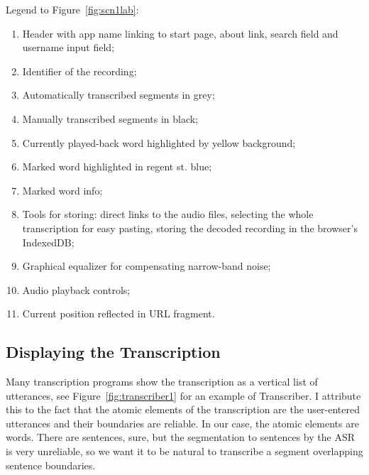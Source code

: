\documentclass[12pt,a4paper]{report}
\begin{document}
Legend to Figure~\ref{fig:scn1lab}:
\begin{enumerate}
\item{
    Header with
    {app name linking to start page,}
    {about link,}
    {search field and}
    {username input field;}
}
\item{Identifier of the recording;}
\item{Automatically transcribed segments in grey;}
\item{Manually transcribed segments in black;}
\item{Currently played-back word highlighted by yellow background;}
\item{Marked word highlighted in regent st. blue;}
\item{Marked word info;}
\item{
    Tools for storing:
    {direct links to the audio files,}
    {selecting the whole transcription for easy pasting,}
    {storing the decoded recording in the browser's IndexedDB;}
}
\item{Graphical equalizer for compensating narrow-band noise;}
\item{Audio playback controls;}
\item{Current position reflected in URL fragment.}
\end{enumerate}

\subsection{Displaying the Transcription}

Many transcription programs show the transcription as a vertical list of
utterances, see Figure~\ref{fig:transcriber1} for an example of
Transcriber. I attribute this to the fact that the atomic elements of
the transcription are the user-entered utterances and their boundaries are
reliable. In our case, the atomic elements are words. There are sentences, sure,
but the segmentation to sentences by the ASR is very unreliable, so we want it
to be natural to transcribe a segment overlapping sentence boundaries.
\end{document}
